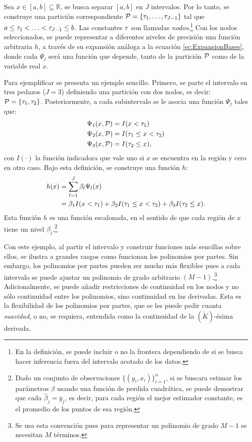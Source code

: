 \documentclass[../Main/Main.tex]{subfiles}
\begin{document}
Sea $x\in[a,b]\subseteq\mathbb{R}$, se busca separar $[a,b]$ en $J$ intervalos. Por lo tanto, se construye una partición correspondiente $\P = \left\{\t_1, \ldots,  \t_{J-1} \right\}$ tal que $a \leq  \t_1 < \ldots <  \t_{J-1} \leq b$. Las constantes $\t$ son llamadas \textit{nodos}.\footnote{En la definición, se puede incluir o no la frontera dependiendo de si se busca hacer inferencia fuera del intervalo acotado de los datos.} Con los nodos seleccionados, se puede representar a diferentes niveles de precisión una función arbitraria $h$, a través de su expansión análoga a la ecuación \eqref{ec:ExpansionBases}, donde cada $\Psi_j$ será una función que depende, tanto de la partición $\P$ como de la variable real $x$. 

Para ejemplificar se presenta un ejemplo sencillo. Primero, se parte el intervalo en tres pedazos ($J = 3$) definiendo una partición con dos nodos, es decir: $\P = \left\{\t_1,  \t_2\right\}$. Posteriormente, a cada subintervalo se le asocia una función $\Psi_j$ tales que:
\begin{align*}
	\Psi_1(x,\P) &= I( x <  \t_1) \\
	\Psi_2(x,\P) &= I( \t_1 \leq x <  \t_2) \\
	\Psi_3(x,\P) &= I( \t_2 \leq x ),
\end{align*}
con $I(\cdot)$ la función indicadora que vale uno si $x$ se encuentra en la región y cero en otro caso. Bajo esta definición, se construye una función $h$: 
\begin{align*}
		h(x) &= \sum_{l = 1}^J \beta_l\Psi_l(x) \\
			 &= \beta_1 I( x <  \t_1) + \beta_2 I( \t_1 \leq x <  \t_2) + \beta_3 I( \t_2 \leq x).
\end{align*}
Esta función $h$ es una función escalonada, en el sentido de que cada región de $x$ tiene un nivel $\beta_j$.\footnote{Dado un conjunto de observaciones $\{(y_i,x_i)\}_{i = 1}^n$, si se buscara estimar los parámetros $\beta$ usando una función de perdida cuadrática, se puede demostrar que cada $\hat{\beta}_j = \bar{y}_j$, es decir, para cada región el mejor estimador constante, es el promedio de los puntos de esa región.}

Con este ejemplo, al partir el intervalo y construir funciones más sencillas sobre ellos, se ilustra a grandes rasgos como funcionan los polinomios por partes. Sin embargo, los polinomios por partes pueden ser mucho más flexibles pues a cada intervalo se puede ajustar un polinomio de grado arbitrario $(M-1)$.\footnote{Se usa esta convención pues para representar un polinomio de grado $M-1$ se necesitan $M$ términos.} Adicionalmente, se puede añadir restricciones de continuidad en los nodos y no sólo continuidad entre los polinomios, sino continuidad en las derivadas. Esta es la flexibilidad de los polinomios por partes, que se les puede pedir cuanta \textit{suavidad}, o no, se requiera, entendida como la continuidad de la $(\tilde{K})$-ésima derivada. 
\end{document}
